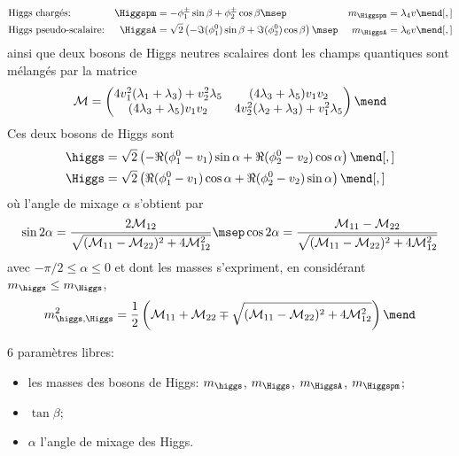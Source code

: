 \begin{align}
&
\text{Higgs chargés:}
&
\Higgspm &= - \phi_1^\pm \sin\beta + \phi_2^\pm \cos\beta
\msep&
m_{\Higgspm} &= \lambda_4 v
\mend[,]
\\
&
\text{Higgs pseudo-scalaire:}
&
\HiggsA &= \sqrt{2}\left(-\Im(\phi_1^0)\sin\beta+\Im(\phi_2^0)\cos\beta\right)
\msep&
m_{\HiggsA} &= \lambda_6 v
\mend[,]
\end{align}
ainsi que deux bosons de Higgs neutres scalaires dont les champs quantiques sont mélangés par la matrice
\begin{equation}
\mathcal{M} = \begin{pmatrix}
4v_1^2 (\lambda_1+\lambda_3) + v_2^2\lambda_5 & (4\lambda_3+\lambda_5)v_1v_2 \\
(4\lambda_3+\lambda_5)v_1v_2 & 4v_2^2 (\lambda_2+\lambda_3) + v_1^2\lambda_5
\end{pmatrix}
\mend
\end{equation}
Ces deux bosons de Higgs sont
\begin{align}
\higgs &= \sqrt{2}\left(-\Re(\phi_1^0-v_1)\sin\alpha+\Re(\phi_2^0-v_2)\cos\alpha\right)
\mend[,]
\\
\Higgs &= \sqrt{2}\left(\Re(\phi_1^0-v_1)\cos\alpha+\Re(\phi_2^0-v_2)\sin\alpha\right)
\mend[,]
\end{align}
où l'angle de mixage $\alpha$ s'obtient par
\begin{equation}
\sin 2\alpha = \frac{2\mathcal{M}_{12}}{\sqrt{(\mathcal{M}_{11}-\mathcal{M}_{22})^2+4\mathcal{M}_{12}^2}}
\msep
\cos 2\alpha = \frac{\mathcal{M}_{11}-\mathcal{M}_{22}}{\sqrt{(\mathcal{M}_{11}-\mathcal{M}_{22})^2+4\mathcal{M}_{12}^2}}
\end{equation}
avec $-\pi/2\leq\alpha\leq0$
et
dont les masses s'expriment, en considérant $m_{\higgs} \leq m_{\Higgs}$,
\begin{equation}
m_{\higgs,\Higgs}^2 = \frac{1}{2} \left( \mathcal{M}_{11} + \mathcal{M}_{22} \mp \sqrt{(\mathcal{M}_{11}-\mathcal{M}_{22})^2+4\mathcal{M}_{12}^2} \right)
\mend
\end{equation}

6 paramètres libres:
\begin{itemize}
\item les masses des bosons de Higgs: $m_{\higgs}$, $m_{\Higgs}$, $m_{\HiggsA}$, $m_{\Higgspm}$;
\item $\tan\beta$;
\item $\alpha$ l'angle de mixage des Higgs.
\end{itemize}

